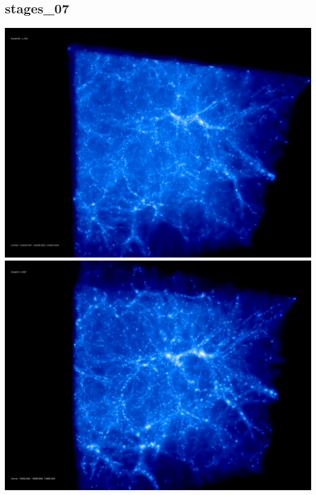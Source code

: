 % 
%
%
%
%
%
%
%

\newpage
\subsection{stages\_07}

\includegraphics[scale=0.1]{stages_07/50.jpg} 
\includegraphics[scale=0.1]{stages_07/100.jpg}  \\

